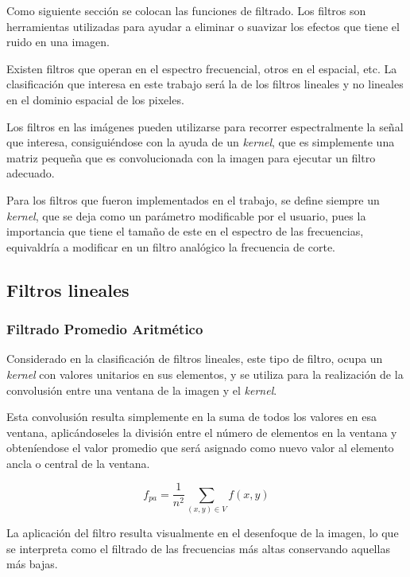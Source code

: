 \hfill\break
\justifying
Como siguiente sección se colocan las funciones de filtrado. Los filtros son herramientas utilizadas para ayudar a eliminar o suavizar los efectos que tiene el ruido en una imagen.

\hfill\break
\justifying
Existen filtros que operan en el espectro frecuencial, otros en el espacial, etc. La clasificación que interesa en este trabajo será la de los filtros lineales y no lineales en el dominio espacial de los pixeles.

\hfill\break
\justifying
Los filtros en las imágenes pueden utilizarse para recorrer espectralmente la señal que interesa, consiguiéndose con la ayuda de un \textit{kernel}, que es simplemente una matriz pequeña que es convolucionada con la imagen para ejecutar un filtro adecuado.

\hfill\break
\justifying
Para los filtros que fueron implementados en el trabajo, se define siempre un \textit{kernel}, que se deja como un parámetro modificable por el usuario, pues la importancia que tiene el tamaño de este en el espectro de las frecuencias, equivaldría a modificar en un filtro analógico la frecuencia de corte.

\subsection*{Filtros lineales}
	
	\subsubsection*{Filtrado Promedio Aritmético}
		\hfill\break
		\justifying
		Considerado en la clasificación de filtros lineales, este tipo de filtro, ocupa un \textit{kernel} con valores unitarios en sus elementos, y se utiliza para la realización de la convolusión entre una ventana de la imagen y el \textit{kernel}.
		
		\hfill\break
		\justifying
		Esta convolusión resulta simplemente en la suma de todos los valores en esa ventana, aplicándoseles la división entre el número de elementos en la ventana y obteníendose el valor promedio que será asignado como nuevo valor al elemento ancla o central de la ventana.
		
		\begin{equation*}
			f_{pa} = \frac{1}{n^2} \sum_{(x,y)\in V} f(x,y)
		\end{equation*}
	
		La aplicación del filtro resulta visualmente en el desenfoque de la imagen, lo que se interpreta como el filtrado de las frecuencias más altas conservando aquellas más bajas.
		
